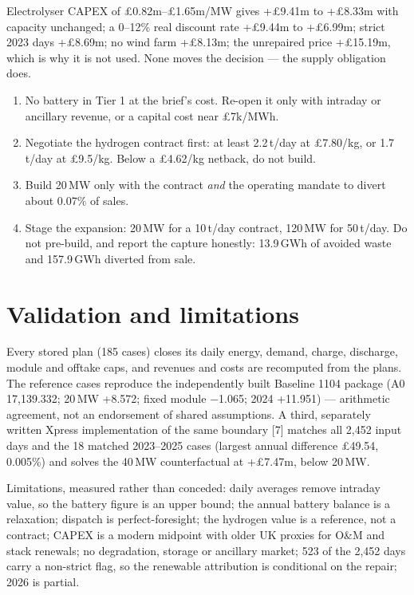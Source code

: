 \documentclass[11pt,a4paper]{article}
\begin{document}
Electrolyser CAPEX of £0.82m--£1.65m/MW gives +£9.41m to +£8.33m with capacity unchanged; a
0--12\% real discount rate +£9.44m to +£6.99m; strict 2023 days +£8.69m; no wind farm +£8.13m;
the unrepaired price +£15.19m, which is why it is not used. None moves the decision --- the supply
obligation does.

\begin{enumerate}
  \item No battery in Tier 1 at the brief's cost. Re-open it only with intraday or ancillary
        revenue, or a capital cost near £7k/MWh.
  \item Negotiate the hydrogen contract first: at least 2.2\,t/day at £7.80/kg, or 1.7\,t/day
        at £9.5/kg. Below a £4.62/kg netback, do not build.
  \item Build 20\,MW only with the contract \emph{and} the operating mandate to divert about
        0.07\% of sales.
  \item Stage the expansion: 20\,MW for a 10\,t/day contract, 120\,MW for 50\,t/day. Do not
        pre-build, and report the capture honestly: 13.9\,GWh of avoided waste and 157.9\,GWh
        diverted from sale.
\end{enumerate}

\section{Validation and limitations}

Every stored plan (185 cases) closes its daily energy, demand, charge, discharge, module and
offtake caps, and revenues and costs are recomputed from the plans. The reference cases reproduce
the independently built Baseline 1104 package (A0 17{,}139.332; 20\,MW +8.572; fixed module
$-$1.065; 2024 +11.951) --- arithmetic agreement, not an endorsement of shared assumptions. A
third, separately written Xpress implementation of the same boundary [7] matches all 2{,}452 input
days and the 18 matched 2023--2025 cases (largest annual difference £49.54, 0.005\%) and solves the
40\,MW counterfactual at +£7.47m, below 20\,MW.

\vspace{3pt}
Limitations, measured rather than conceded: daily averages remove intraday value, so the battery
figure is an upper bound; the annual battery balance is a relaxation; dispatch is
perfect-foresight; the hydrogen value is a reference, not a contract; CAPEX is a modern midpoint
with older UK proxies for O\&M and stack renewals; no degradation, storage or ancillary market;
523 of the 2{,}452 days carry a non-strict flag, so the renewable attribution is conditional on
the repair; 2026 is partial.
\end{document}
